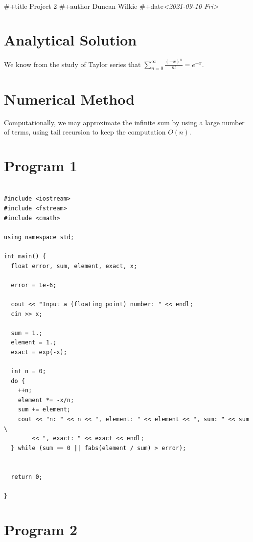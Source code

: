 \documentclass[11pt]{article}
\date{\today}
\title{}
\begin{document}
\tableofcontents

\#+title Project 2
\#+author Duncan Wilkie
\#+date\textit{<2021-09-10 Fri>}


\section{Analytical Solution}
\label{sec:orgf4520d7}

We know from the study of Taylor series that \(\sum_{n=0}^\infty\frac{(-x)^n}{n!} = e^{-x}\). 

\section{Numerical Method}
\label{sec:org8e56bb6}

Computationally, we may approximate the infinite sum by using a large number of terms, using tail recursion to keep the computation \(O(n)\).

\section{Program 1}
\label{sec:org517aaca}

\begin{verbatim}

#include <iostream>
#include <fstream>
#include <cmath>

using namespace std;

int main() {
  float error, sum, element, exact, x;

  error = 1e-6;

  cout << "Input a (floating point) number: " << endl;
  cin >> x;

  sum = 1.;
  element = 1.;
  exact = exp(-x);

  int n = 0;
  do {
    ++n;
    element *= -x/n;
    sum += element;
    cout << "n: " << n << ", element: " << element << ", sum: " << sum \
        << ", exact: " << exact << endl;
  } while (sum == 0 || fabs(element / sum) > error);


  return 0;

}

\end{verbatim}

\section{Program 2}
\label{sec:org2b59d8a}
\end{document}
